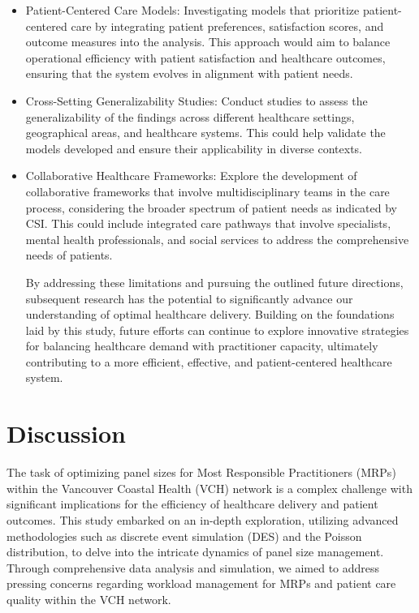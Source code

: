 \documentclass[11pt]{article}
\theoremstyle{definition}
\begin{document}
\begin{itemize}
\item Patient-Centered Care Models: Investigating models that prioritize patient-centered care by integrating patient preferences, satisfaction scores, and outcome measures into the analysis. This approach would aim to balance operational efficiency with patient satisfaction and healthcare outcomes, ensuring that the system evolves in alignment with patient needs.

\item Cross-Setting Generalizability Studies: Conduct studies to assess the generalizability of the findings across different healthcare settings, geographical areas, and healthcare systems. This could help validate the models developed and ensure their applicability in diverse contexts.

\item Collaborative Healthcare Frameworks: Explore the development of collaborative frameworks that involve multidisciplinary teams in the care process, considering the broader spectrum of patient needs as indicated by CSI. This could include integrated care pathways that involve specialists, mental health professionals, and social services to address the comprehensive needs of patients.

By addressing these limitations and pursuing the outlined future directions, subsequent research has the potential to significantly advance our understanding of optimal healthcare delivery. Building on the foundations laid by this study, future efforts can continue to explore innovative strategies for balancing healthcare demand with practitioner capacity, ultimately contributing to a more efficient, effective, and patient-centered healthcare system.
\end{itemize}



\section{Discussion}
The task of optimizing panel sizes for Most Responsible Practitioners (MRPs) within the Vancouver Coastal Health (VCH) network is a complex challenge with significant implications for the efficiency of healthcare delivery and patient outcomes. This study embarked on an in-depth exploration, utilizing advanced methodologies such as discrete event simulation (DES) and the Poisson distribution, to delve into the intricate dynamics of panel size management. Through comprehensive data analysis and simulation, we aimed to address pressing concerns regarding workload management for MRPs and patient care quality within the VCH network. \\
\end{document}
